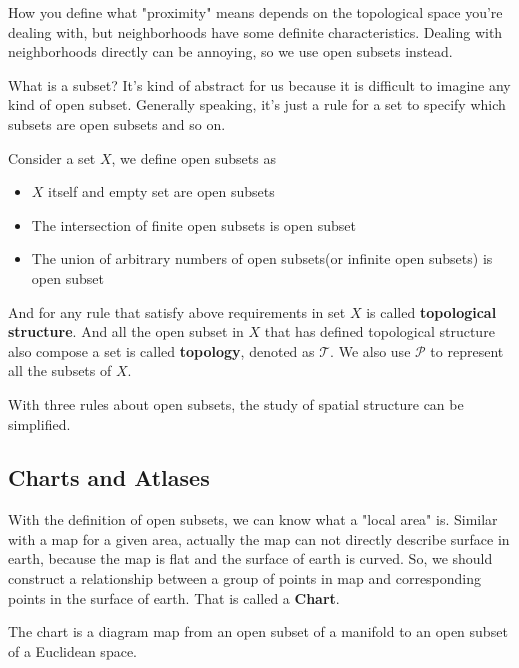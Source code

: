 How you define what "proximity" means depends on the topological space you're dealing with, but neighborhoods have some definite characteristics. Dealing with neighborhoods directly can be annoying, so we use open subsets instead.

What is a subset? It's kind of abstract for us because it is difficult to imagine any kind of open subset. Generally speaking, it's just a rule for a set to specify which subsets are open subsets and so on.

\begin{tcolorbox}[title=\textbf{Open Subsets},colback=SeaGreen!10!CornflowerBlue!10,colframe=RoyalPurple!55!Aquamarine!100!]
    Consider a set $X$, we define open subsets as 
    \begin{itemize}
        \item $X$ itself and empty set are open subsets
        \item The intersection of finite open subsets is open subset
        \item The union of arbitrary numbers of open subsets(or infinite open subsets) is open subset
    \end{itemize}
\end{tcolorbox}

And for any rule that satisfy above requirements in set $X$ is called \textbf{topological structure}. And all the open subset in $X$ that has defined topological structure also compose a set is called \textbf{topology}, denoted as $\mathscr{T}$. We also use $\mathscr{P}$ to represent all the subsets of $X$. 

With three rules about open subsets, the study of spatial structure can be simplified.

\subsection{Charts and Atlases}

With the definition of open subsets, we can know what a "local area" is. Similar with a map for a given area, actually the map can not directly describe surface in earth, because the map is flat and the surface of earth is curved. So, we should construct a relationship between a group of points in map and corresponding points in the surface of earth. That is called a \textbf{Chart}.

\begin{tcolorbox}[title=\textbf{Charts},colback=SeaGreen!10!CornflowerBlue!10,colframe=RoyalPurple!55!Aquamarine!100!]
    The chart is a diagram map from an open subset of a manifold to an open subset of a Euclidean space.
\end{tcolorbox}
 
